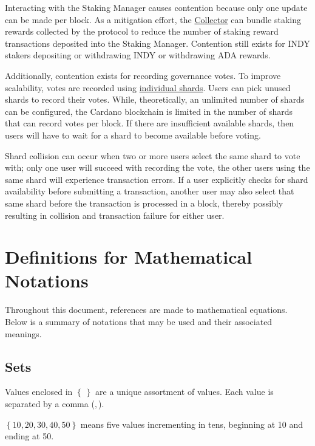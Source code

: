 \documentclass{article}
\begin{document}
\begin{sloppypar}
Interacting with the Staking Manager causes contention because only one
update can be made per block. As a mitigation effort, the
\protect\hyperlink{collector}{Collector} can bundle staking rewards
collected by the protocol to reduce the number of staking reward
transactions deposited into the Staking Manager. Contention still exists
for INDY stakers depositing or withdrawing INDY or withdrawing ADA
rewards.

Additionally, contention exists for recording governance votes. To
improve scalability, votes are recorded using
\protect\hyperlink{governance-sharding}{individual shards}. Users can
pick unused shards to record their votes. While, theoretically, an
unlimited number of shards can be configured, the Cardano blockchain is
limited in the number of shards that can record votes per block. If
there are insufficient available shards, then users will have to wait
for a shard to become available before voting.

Shard collision can occur when two or more users select the same shard
to vote with; only one user will succeed with recording the vote, the
other users using the same shard will experience transaction errors. If
a user explicitly checks for shard availability before submitting a
transaction, another user may also select that same shard before the
transaction is processed in a block, thereby possibly resulting in
collision and transaction failure for either user.

\hypertarget{definitions-for-mathematical-notations}{%
\section{Definitions for Mathematical
Notations}\label{definitions-for-mathematical-notations}}

Throughout this document, references are made to mathematical equations.
Below is a summary of notations that may be used and their associated
meanings.

\hypertarget{sets}{%
\subsection{Sets}\label{sets}}

Values enclosed in \(\left\{ \  \right\}\) are a unique assortment of
values. Each value is separated by a comma (\(,\)).

\(\left\{ 10,20,30,40,50 \right\}\) means five values incrementing in
tens, beginning at 10 and ending at 50.


\end{sloppypar}
\end{document}
